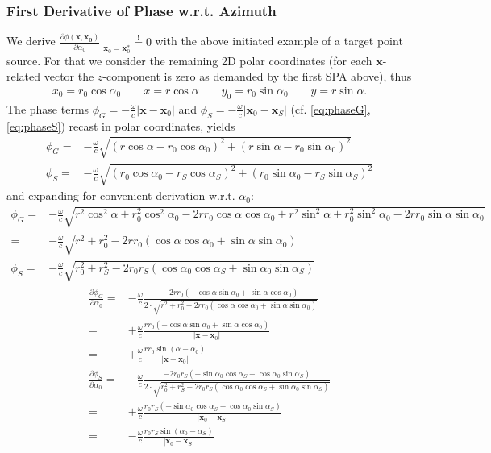 \documentclass[a4paper,BCOR=15mm,10pt,twoside]{scrartcl}
\newcommand\wc{\frac{\omega}{c}}  %
\newcommand\azx{\alpha}  %
\renewcommand{\vec}[1]{\mathbf{#1}}  %
\begin{document}
\subsubsection{First Derivative of Phase w.r.t. Azimuth}
We derive $\frac{\partial \phi(\vec{x}, \vec{x_0})}{\partial \azx_0}\big|_{\vec{x}_0=\vec{x}_0^*} \stackrel{!}{=} 0$ with the above initiated example of a target point source.
For that we consider the remaining 2D polar coordinates (for each $\vec{x}$-related vector the $z$-component is zero as demanded by the first SPA above), thus
\begin{align}
x_0 = r_0 \cos\azx_0\qquad x = r \cos\azx\qquad y_0 = r_0 \sin\azx_0\qquad y = r \sin\azx.
\end{align}
The phase terms
$\phi_G = -\wc |\vec{x} -\vec{x}_0|$ and $\phi_S = -\wc |\vec{x}_0 - \vec{x}_S|$ (cf. \eqref{eq:phaseG}, \eqref{eq:phaseS}) recast in polar coordinates, yields
\begin{align}
\phi_G =& -\wc \sqrt{(r \cos\azx-r_0 \cos\azx_0)^2 + (r \sin\azx-r_0 \sin\azx_0)^2}\\
\phi_S =& -\wc \sqrt{(r_0 \cos\azx_0-r_S \cos\azx_S)^2 + (r_0 \sin\azx_0-r_S \sin\azx_S)^2}
\end{align}
and expanding for convenient derivation w.r.t. $\azx_0$:
\begin{align}
\phi_G =& -\wc \sqrt{r^2 \cos^2\azx + r_0^2 \cos^2\azx_0 -2 r r_0 \cos\azx \cos\azx_0 + r^2 \sin^2\azx + r_0^2 \sin^2\azx_0 -2 r r_0 \sin\azx \sin\azx_0}\\
=& -\wc \sqrt{r^2 + r_0^2 - 2 r r_0 (\cos\azx \cos\azx_0 + \sin\azx \sin\azx_0)}\\
\phi_S =& -\wc \sqrt{r_0^2 + r_S^2 - 2 r_0 r_S (\cos\azx_0 \cos\azx_S + \sin\azx_0 \sin\azx_S)}
\end{align}
\begin{align}
\frac{\partial \phi_G}{\partial \azx_0} =& -\wc \frac{- 2 r r_0 (-\cos\azx\sin\azx_0+\sin\azx \cos\azx_0)}{2\cdot \sqrt{r^2 + r_0^2 - 2 r r_0 (\cos\azx \cos\azx_0 + \sin\azx \sin\azx_0)}}\\
=& + \wc \frac{r r_0 (-\cos\azx\sin\azx_0+\sin\azx \cos\azx_0)}{|\vec{x} -\vec{x}_0|}\\
=& + \wc \frac{r r_0 \sin(\azx-\azx_0)}{|\vec{x} -\vec{x}_0|}\\
\frac{\partial \phi_S}{\partial \azx_0} =& -\wc \frac{- 2 r_0 r_S (-\sin\azx_0\cos\azx_S+\cos\azx_0\sin\azx_S)}{2\cdot \sqrt{r_0^2 + r_S^2 - 2 r_0 r_S (\cos\azx_0 \cos\azx_S + \sin\azx_0 \sin\azx_S)}}\\
=& +\wc \frac{r_0 r_S (-\sin\azx_0\cos\azx_S+\cos\azx_0\sin\azx_S)}{|\vec{x}_0 - \vec{x}_S|}\\
=& -\wc \frac{r_0 r_S \sin(\azx_0 - \azx_S)}{|\vec{x}_0 - \vec{x}_S|}
\end{align}
\end{document}
